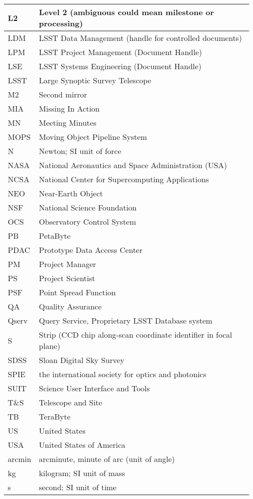 \begin{longtable}{|l|p{}|}
L2 & Level 2 (ambiguous could mean milestone or processing) \\\hline
LDM & LSST Data Management (handle for controlled documents) \\\hline
LPM & LSST Project Management (Document Handle) \\\hline
LSE & LSST Systems Engineering (Document Handle) \\\hline
LSST & Large Synoptic Survey Telescope \\\hline
M2 & Second mirror \\\hline
MIA & Missing In Action \\\hline
MN & Meeting Minutes \\\hline
MOPS & Moving Object Pipeline System \\\hline
N & Newton; SI unit of force \\\hline
NASA & National Aeronautics and Space Administration (USA) \\\hline
NCSA & National Center for Supercomputing Applications \\\hline
NEO & Near-Earth Object \\\hline
NSF & National Science Foundation \\\hline
OCS & Observatory Control System \\\hline
PB & PetaByte \\\hline
PDAC & Prototype Data Access Center \\\hline
PM & Project Manager \\\hline
PS & Project Scientist \\\hline
PSF & Point Spread Function \\\hline
QA & Quality Assurance \\\hline
Qserv & Query Service, Proprietary LSST Database system \\\hline
S & Strip (CCD chip along-scan coordinate identifier in focal plane) \\\hline
SDSS & Sloan Digital Sky Survey \\\hline
SPIE & the international society for optics and photonics \\\hline
SUIT & Science User Interface and Tools \\\hline
T\&S & Telescope and Site \\\hline
TB & TeraByte \\\hline
US & United States \\\hline
USA & United States of America \\\hline
arcmin & arcminute, minute of arc (unit of angle) \\\hline
kg & kilogram; SI unit of mass \\\hline
s & second; SI unit of time \\\hline
\end{longtable}
